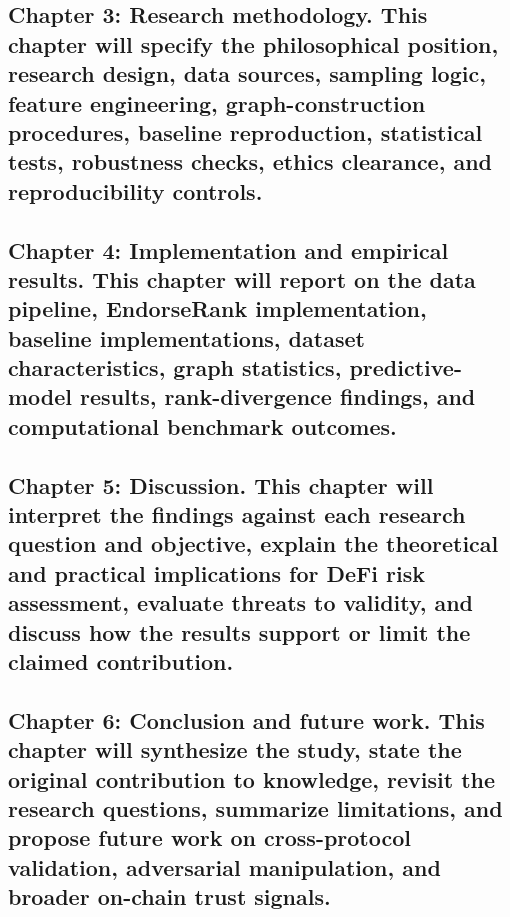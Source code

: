 \documentclass[
]{article}
\begin{document}
\subsection{Chapter 3: Research methodology. This chapter will specify the philosophical position, research design, data sources, sampling logic, feature engineering, graph-construction procedures, baseline reproduction, statistical tests, robustness checks, ethics clearance, and reproducibility controls.}\label{chapter-3-research-methodology.-this-chapter-will-specify-the-philosophical-position-research-design-data-sources-sampling-logic-feature-engineering-graph-construction-procedures-baseline-reproduction-statistical-tests-robustness-checks-ethics-clearance-and-reproducibility-controls.}

\subsection{Chapter 4: Implementation and empirical results. This chapter will report on the data pipeline, EndorseRank implementation, baseline implementations, dataset characteristics, graph statistics, predictive-model results, rank-divergence findings, and computational benchmark outcomes.}\label{chapter-4-implementation-and-empirical-results.-this-chapter-will-report-on-the-data-pipeline-endorserank-implementation-baseline-implementations-dataset-characteristics-graph-statistics-predictive-model-results-rank-divergence-findings-and-computational-benchmark-outcomes.}

\subsection{Chapter 5: Discussion. This chapter will interpret the findings against each research question and objective, explain the theoretical and practical implications for DeFi risk assessment, evaluate threats to validity, and discuss how the results support or limit the claimed contribution.}\label{chapter-5-discussion.-this-chapter-will-interpret-the-findings-against-each-research-question-and-objective-explain-the-theoretical-and-practical-implications-for-defi-risk-assessment-evaluate-threats-to-validity-and-discuss-how-the-results-support-or-limit-the-claimed-contribution.}

\subsection{Chapter 6: Conclusion and future work. This chapter will synthesize the study, state the original contribution to knowledge, revisit the research questions, summarize limitations, and propose future work on cross-protocol validation, adversarial manipulation, and broader on-chain trust signals.}\label{chapter-6-conclusion-and-future-work.-this-chapter-will-synthesize-the-study-state-the-original-contribution-to-knowledge-revisit-the-research-questions-summarize-limitations-and-propose-future-work-on-cross-protocol-validation-adversarial-manipulation-and-broader-on-chain-trust-signals.}
\end{document}
